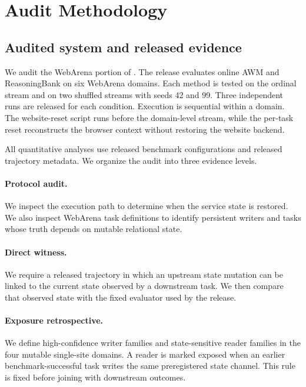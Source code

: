\section{Audit Methodology}
\label{sec:method}

\subsection{Audited system and released evidence}
We audit the WebArena portion of \citet{ye2026fragility}. The release evaluates online AWM and ReasoningBank on six WebArena domains. Each method is tested on the ordinal stream and on two shuffled streams with seeds 42 and 99. Three independent runs are released for each condition. Execution is sequential within a domain. The website-reset script runs before the domain-level stream, while the per-task reset reconstructs the browser context without restoring the website backend.

All quantitative analyses use released benchmark configurations and released trajectory metadata. We organize the audit into three evidence levels.

\paragraph{Protocol audit.} We inspect the execution path to determine when the service state is restored. We also inspect WebArena task definitions to identify persistent writers and tasks whose truth depends on mutable relational state.

\paragraph{Direct witness.} We require a released trajectory in which an upstream state mutation can be linked to the current state observed by a downstream task. We then compare that observed state with the fixed evaluator used by the release.

\paragraph{Exposure retrospective.} We define high-confidence writer families and state-sensitive reader families in the four mutable single-site domains. A reader is marked exposed when an earlier benchmark-successful task writes the same preregistered state channel. This rule is fixed before joining with downstream outcomes.

